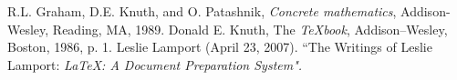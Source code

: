 \begin{thebibliography}{9}

R.L. Graham, D.E. Knuth, and O. Patashnik, \emph{Concrete
mathematics}, Addison-Wesley, Reading, MA, 1989.
Donald E. Knuth, The \emph{TeXbook}, Addison–Wesley, Boston, 1986, p. 1.
Leslie Lamport (April 23, 2007). ``The Writings of Leslie Lamport: \emph{LaTeX: A Document Preparation System".}





\end{thebibliography}

